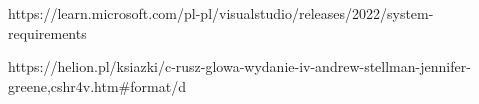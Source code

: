 \documentclass[polish,12pt,twoside,a4paper]{report}
\begin{document}



\newpage

\newpage

\newpage

\newpage


\begin{thebibliography}{6}

 https://learn.microsoft.com/pl-pl/visualstudio/releases/2022/system-requirements

https://helion.pl/ksiazki/c-rusz-glowa-wydanie-iv-andrew-stellman-jennifer-greene,cshr4v.htm\#format/d


\end{thebibliography}
\newpage


\end{document}
